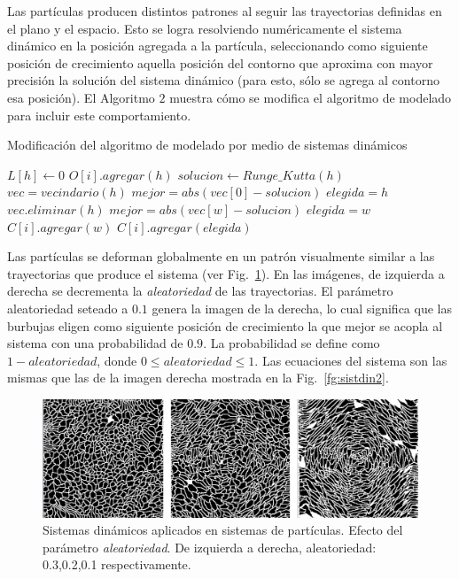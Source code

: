 Las part\'iculas producen distintos patrones al seguir las trayectorias definidas en el plano y el espacio.
Esto se logra resolviendo num\'ericamente el sistema din\'amico en la posici\'on agregada a la part\'icula, seleccionando como siguiente posici\'on de crecimiento aquella posici\'on del contorno que aproxima con mayor precisión la soluci\'on del sistema din\'amico (para esto, sólo se agrega al contorno esa posición).
El Algoritmo $2$ muestra cómo se modifica el algoritmo de modelado para incluir este comportamiento.

\begin{algorithm}[h!]
\caption{Modificación del algoritmo de modelado por medio de sistemas dinámicos}
\begin{algorithmic}
\State $L[h]\gets 0$ 
\State $O[i].agregar(h)$
\State $solucion \gets Runge\_Kutta(h)$
\State $vec = vecindario(h)$
\State $mejor = abs(vec[0] - solucion)$
\State $elegida = h$
\State $vec.eliminar(h)$
        \State $mejor = abs(vec[w]-solucion)$
        \State $elegida = w$
    \EndIf
        \State $C[i].agregar(w)$
    \EndIf
\EndFor
{}
\State $C[i].agregar(elegida)$
\end{algorithmic}
\end{algorithm}

Las part\'iculas se deforman globalmente en un patr\'on visualmente similar a las trayectorias que produce el sistema (ver Fig.~\ref{fg:sistdin3}).
En las im\'agenes, de izquierda a derecha se decrementa la {\em aleatoriedad} de las trayectorias.
El par\'ametro aleatoriedad seteado a $0.1$ genera la imagen de la derecha, lo cual significa que las burbujas eligen como siguiente posición de crecimiento la que mejor se acopla al sistema con una probabilidad de $0.9$.
La probabilidad se define como $1-aleatoriedad$, donde $0 \leq aleatoriedad \leq 1$.
Las ecuaciones del sistema son las mismas que las de la imagen derecha mostrada en la Fig.~\ref{fg:sistdin2}.

\begin{figure}[htb!]
  \centerline{\includegraphics[width=13cm]{figures/sistdin3}}
  \caption[Sistemas din\'amicos aplicados en sistemas de part\'iculas]{Sistemas din\'amicos aplicados en sistemas de part\'iculas. Efecto del parámetro {\em aleatoriedad}. De izquierda a derecha, aleatoriedad: 0.3,0.2,0.1 respectivamente. }
  \label{fg:sistdin3}
\end{figure}

